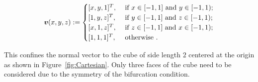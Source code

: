 \documentclass[12pt]{article}
\numberwithin{equation}{section}
\begin{document}
\begin{equation}
  {\boldsymbol{v}}(x,y,z)
  :=
  \begin{cases}
    [x,y,1]^T,
    &
    \text{ if }x \in [-1,1] \text{ and } y \in [-1,1);
    \\
    [1,y,z]^T,
    &
    \text{ if }y \in [-1,1] \text{ and } z \in [-1,1);
    \\
    [x,1,z]^T,
    &
    \text{ if }z \in [-1,1] \text{ and } x \in [-1,1);
    \\
    [1,1,1]^T,
    &
    \text{ otherwise }.
  \end{cases}
\end{equation}

This confines the normal vector to the cube of side length $2$
centered at the origin as shown in Figure~\ref{fig:Cartesian}. Only
three faces of the cube need to be considered due to the symmetry of
the bifurcation condition.
\end{document}
